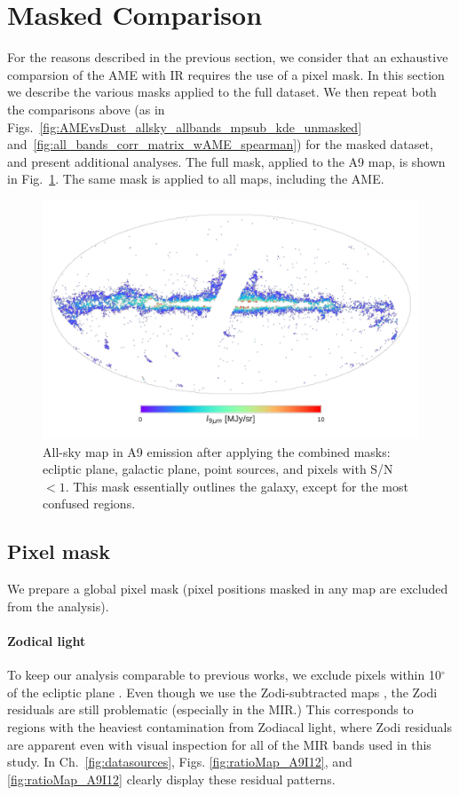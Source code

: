       \section{Masked Comparison}
        For the reasons described in the previous section, we consider that an exhaustive comparsion of the AME with IR requires the use of a pixel mask. In this section we describe the various masks applied to the full dataset. We then repeat both the comparisons above (as in  Figs.~\ref{fig:AMEvsDust_allsky_allbands_mpsub_kde_unmasked} and~\ref{fig:all_bands_corr_matrix_wAME_spearman}) for the masked dataset, and present additional analyses. The full mask, applied to the A9 map, is shown in Fig.~\ref{fig:A9_masked_map}. The same mask is applied to all maps, including the AME.
          \begin{figure}
            \includegraphics[width=\textwidth]{../Plots/ch_allsky/masked_map_A9.pdf}
            \centering
            \caption{All-sky map in A9 emission after applying the combined masks: ecliptic plane, galactic plane, point sources, and pixels with S/N $<1$. This mask essentially outlines the galaxy, except for the most confused regions.}
            \label{fig:A9_masked_map}
          \end{figure}

      \subsection{Pixel mask}
          We prepare a global pixel mask (pixel positions masked in any map are excluded from the analysis).

        \paragraph{Zodical light}
          To keep our analysis comparable to previous works, we exclude pixels within 10$^{\circ}$ of the ecliptic plane \citep{hensley16}.  Even though we use the Zodi-subtracted maps \citep{kelsall98, kondo16, ootsubo16}, the Zodi residuals are still problematic (especially in the MIR.) This corresponds to regions with the heaviest contamination from Zodiacal light, where Zodi residuals are apparent even with visual inspection for all of the MIR bands used in this study. In Ch.~\ref{fig:datasources}, Figs. \ref{fig:ratioMap_A9I12}, and \ref{fig:ratioMap_A9I12} clearly display these residual patterns.


